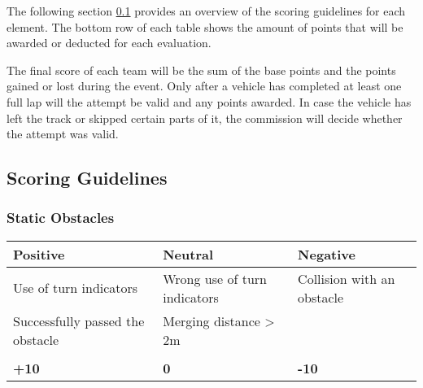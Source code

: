 {	The following section \ref{obstacle_scoring_guidelines} provides an overview of
	the scoring guidelines for each element. The bottom row of each table shows the
	amount of points that will be awarded or deducted for each evaluation.

	The final score of each team will be the sum of the base points and the points
	gained or lost during the event. Only after a vehicle has completed at least
	one full lap will the attempt be valid and any points awarded. In case the
	vehicle has left the track or skipped certain parts of it, the commission will
	decide whether the attempt was valid.

	\subsection{Scoring Guidelines}
	\label{obstacle_scoring_guidelines}

	\subsubsection*{Static Obstacles}
	\begin{table}[H]
		\begin{tabularx}{\textwidth}{XXX}
			\toprule
			\textbf{Positive}                & \textbf{Neutral}             & \textbf{Negative}          \\
			\midrule
			Use of turn indicators           & Wrong use of turn indicators & Collision with an obstacle \\
			Successfully passed the obstacle & Merging distance > 2m        &                            \\
			                                 &                              &                            \\
			\topstrut
			\textbf{+10}                     & \textbf{0}                   & \textbf{-10}               \\
			\bottomrule
		\end{tabularx}
	\end{table}

}
